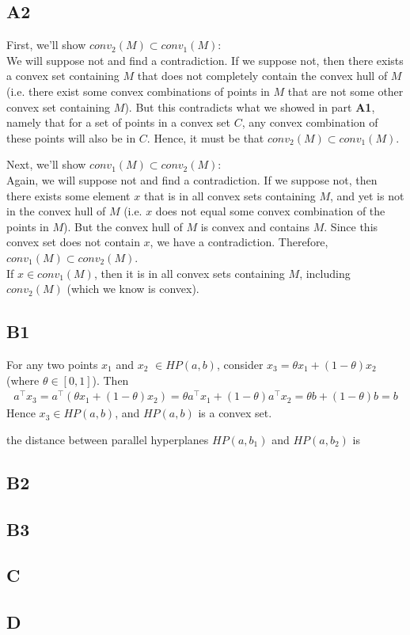\documentclass{article}
\begin{document}
\subsection{A2}
First, we'll show $conv_2(M) \subset conv_1(M)$:\\ We will suppose not and find
a contradiction. If we suppose not, then there exists a convex set containing
$M$ that does not completely contain the convex hull of $M$ (i.e. there exist
some convex combinations of points in $M$ that are not some other convex set
containing $M$). But this contradicts what we showed in part \textbf{A1},
namely that for a set of points in a convex set $C$, any convex combination of
these points will also be in $C$. Hence, it must be that $conv_2(M) \subset
conv_1(M)$.

Next, we'll show $conv_1(M) \subset conv_2(M)$:\\ Again, we will suppose not
and find a contradiction. If we suppose not, then there exists some element $x$
that is in all convex sets containing $M$, and yet is not in the convex hull of
$M$ (i.e. $x$ does not equal some convex combination of the points in $M$). But
the convex hull of $M$ is convex and contains $M$.  Since this convex set does
not contain $x$, we have a contradiction. Therefore, $conv_1(M) \subset
conv_2(M)$.\\
If $x \in conv_1(M)$, then it is in all convex sets containing $M$, including
$conv_2(M)$ (which we know is convex).


\subsection{B1}
For any two points $x_1$ and $x_2$ $\in HP(a,b)$, consider $x_3 = \theta x_1 +
(1-\theta) x_2$ (where $\theta \in [0,1]$). Then
\begin{align}
    a^{\top} x_3 = a^{\top} (\theta x_1 + (1-\theta) x_2) = \theta a^{\top} x_1
    + (1-\theta) a^{\top} x_2 = \theta b + (1-\theta) b = b
\end{align}
Hence $x_3 \in HP(a,b)$, and $HP(a,b)$ is a convex set.

the distance between parallel hyperplanes $HP(a,b_1)$ and $HP(a,b_2)$ is 


\subsection{B2}


\subsection{B3}


\subsection{C}


\subsection{D}
\end{document}
